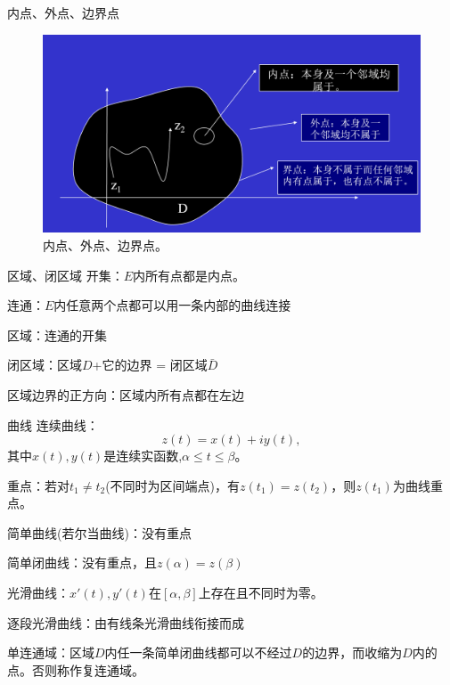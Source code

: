 \documentclass[11pt]{beamer}
\newcommand{\kong}[1][0.5]{\vspace{#1cm}}
\begin{document}
\begin{frame}{内点、外点、边界点}
\pagecolor{blue}
\begin{figure}
	\centering
	\includegraphics[width=0.9\linewidth]{chap1_03}
	\caption{内点、外点、边界点。}
	\label{fig:chap103}
\end{figure}

\end{frame}

\begin{frame}{区域、闭区域}
\kong[0.5]
开集：$E$内所有点都是内点。

\kong[0.5]
连通：$E$内任意两个点都可以用一条内部的曲线连接

\kong[0.5]
{\color{blue}区域：连通的开集}

\kong[0.5]
闭区域：区域$D$+它的边界 = 闭区域$\bar{D}$

\kong[0.5]
区域边界的正方向：区域内所有点都在左边

\end{frame}

\begin{frame}{曲线}
连续曲线：
\begin{equation}
z(t) = x(t) + iy(t),
\end{equation}
其中$x(t),y(t)$是连续实函数,$\alpha \leq t \leq \beta$。

\kong[0.5]
重点：若对$t_1 \neq t_2$(不同时为区间端点)，有$z(t_1) = z(t_2)$，则$z(t_1)$为曲线重点。

\kong[0.5]
简单曲线(若尔当曲线)：没有重点

\kong[0.5]
简单闭曲线：没有重点，且$z(\alpha)=z(\beta)$

\kong[0.5]
光滑曲线：$x'(t), y'(t)$在$[\alpha, \beta]$上存在且不同时为零。

\kong[0.5]
逐段光滑曲线：由有线条光滑曲线衔接而成

\kong[0.5]
单连通域：区域$D$内任一条简单闭曲线都可以不经过$D$的边界，而收缩为$D$内的点。否则称作复连通域。
\end{frame}
\end{document}
